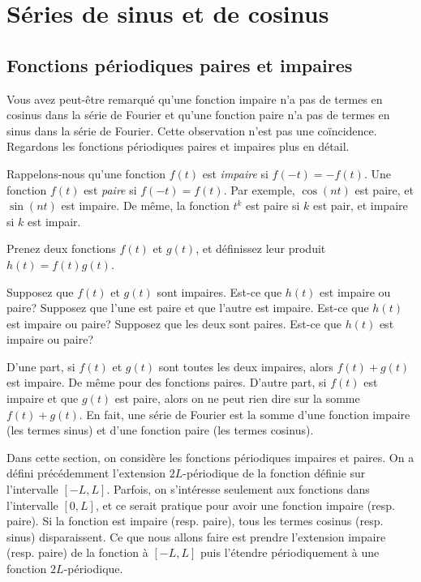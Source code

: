 
\sectionnewpage
\section{Séries de sinus et de cosinus}
\label{sec:scs}


\subsection{Fonctions périodiques paires et impaires}

Vous avez peut-être remarqué qu'une fonction impaire n'a pas de termes en cosinus dans la série de Fourier et qu'une fonction paire n'a pas de termes en sinus dans la série de Fourier.
Cette observation n'est pas une coïncidence. Regardons les fonctions périodiques paires et impaires plus en détail.

Rappelons-nous qu'une fonction $f(t)$ est \emph{impaire} si $f(-t) =
-f(t)$.  Une fonction $f(t)$ est \emph{paire} si
$f(-t) = f(t)$.  Par exemple, $\cos (n t)$ est paire, et  $\sin (n t)$ est impaire.
De même, la fonction $t^k$ est paire si $k$ est pair, et impaire si $k$ est impair.

\begin{exercise}
Prenez deux fonctions $f(t)$ et $g(t)$, et définissez leur produit $h(t) =
f(t)g(t)$.
\begin{tasks}
\task Supposez que $f(t)$ et $g(t)$ sont impaires.  Est-ce que $h(t)$ est impaire ou paire?
\task Supposez que l'une est paire et que l'autre est impaire. Est-ce que $h(t)$ est impaire ou paire?
\task Supposez que les deux sont paires. Est-ce que $h(t)$ est impaire ou paire?
\end{tasks}
\end{exercise}

D'une part, si $f(t)$ et $g(t)$ sont toutes les deux impaires, alors $f(t)+g(t)$ est impaire.  De même pour des fonctions paires. D'autre part, si  $f(t)$ est impaire et que $g(t)$ est paire,  alors on ne peut rien dire sur la somme $f(t) + g(t)$.  En fait, une série de Fourier est la somme d'une fonction impaire (les termes sinus) et d'une fonction paire (les termes cosinus).

Dans cette section, on considère les fonctions périodiques impaires et paires. On a défini précédemment l'extension $2L$-périodique de la fonction définie sur l'intervalle $[-L,L]$. Parfois, on s'intéresse seulement aux fonctions dans l'intervalle $[0,L]$, et ce serait pratique pour avoir une fonction impaire (resp. paire). Si la fonction est impaire (resp. paire), tous les termes cosinus (resp. sinus) disparaissent.
Ce que nous allons faire est prendre l'extension impaire (resp. paire) de la fonction à $[-L,L]$ 
puis l'étendre périodiquement à une fonction $2L$-périodique.  

